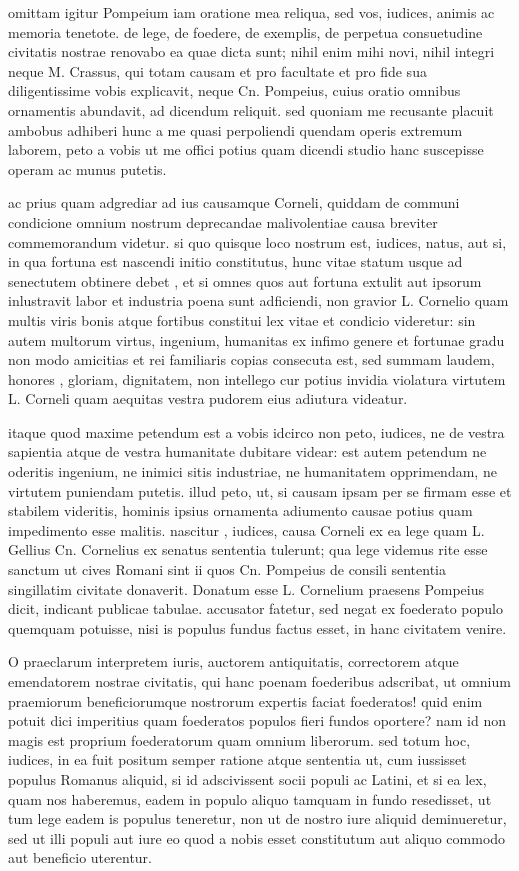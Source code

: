  omittam igitur Pompeium iam oratione mea reliqua, sed vos, iudices, animis ac memoria tenetote. de lege, de foedere, de exemplis, de perpetua consuetudine civitatis nostrae renovabo ea quae dicta sunt; nihil enim mihi novi, nihil integri neque M. Crassus, qui totam causam et pro facultate et pro fide sua diligentissime vobis explicavit, neque Cn. Pompeius, cuius oratio omnibus ornamentis abundavit, ad dicendum reliquit. sed quoniam me recusante placuit ambobus adhiberi hunc a me quasi perpoliendi quendam operis extremum laborem, peto a vobis ut me offici potius quam dicendi studio hanc suscepisse operam ac munus putetis.

 ac prius quam adgrediar ad ius causamque Corneli, quiddam de communi condicione omnium nostrum deprecandae malivolentiae causa breviter commemorandum videtur. si quo quisque loco nostrum est, iudices, natus, aut si, in qua fortuna est nascendi initio constitutus, hunc vitae statum usque ad senectutem obtinere debet , et si omnes quos aut fortuna extulit aut ipsorum inlustravit labor et industria poena sunt adficiendi, non gravior L. Cornelio quam multis viris bonis atque fortibus constitui lex vitae et condicio videretur: sin autem multorum virtus, ingenium, humanitas ex infimo genere et fortunae gradu non modo amicitias et rei familiaris copias consecuta est, sed summam laudem, honores , gloriam, dignitatem, non intellego cur potius invidia violatura virtutem L. Corneli quam aequitas vestra pudorem eius adiutura videatur.

 itaque quod maxime petendum est a vobis idcirco non peto, iudices, ne de vestra sapientia atque de vestra humanitate dubitare videar: est autem petendum ne oderitis ingenium, ne inimici sitis industriae, ne humanitatem opprimendam, ne virtutem puniendam putetis. illud peto, ut, si causam ipsam per se firmam esse et stabilem videritis, hominis ipsius ornamenta adiumento causae potius quam impedimento esse malitis. nascitur , iudices, causa Corneli ex ea lege quam L. Gellius Cn. Cornelius ex senatus sententia tulerunt; qua lege videmus rite esse sanctum ut cives Romani sint ii quos Cn. Pompeius de consili sententia singillatim civitate donaverit. Donatum esse L. Cornelium praesens Pompeius dicit, indicant publicae tabulae. accusator fatetur, sed negat ex foederato populo quemquam potuisse, nisi is populus fundus factus esset, in hanc civitatem venire.

 O praeclarum interpretem iuris, auctorem antiquitatis, correctorem atque emendatorem nostrae civitatis, qui hanc poenam foederibus adscribat, ut omnium praemiorum beneficiorumque nostrorum expertis faciat foederatos! quid enim potuit dici imperitius quam foederatos populos fieri fundos oportere? nam id non magis est proprium foederatorum quam omnium liberorum. sed totum hoc, iudices, in ea fuit positum semper ratione atque sententia ut, cum iussisset populus Romanus aliquid, si id adscivissent socii populi ac Latini, et si ea lex, quam nos haberemus, eadem in populo aliquo tamquam in fundo resedisset, ut tum lege eadem is populus teneretur, non ut de nostro iure aliquid deminueretur, sed ut illi populi aut iure eo quod a nobis esset constitutum aut aliquo commodo aut beneficio uterentur.

